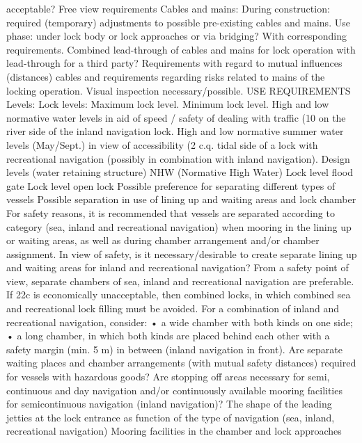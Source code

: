 acceptable?
Free view requirements
Cables and mains:
During construction: required (temporary) adjustments to possible
pre-existing cables and mains.
Use phase: under lock body or lock approaches or via bridging?
With corresponding requirements.
Combined lead-through of cables and mains for lock operation with
lead-through for a third party?
Requirements with regard to mutual influences (distances) cables
and requirements regarding risks related to mains of the locking
operation.
Visual inspection necessary/possible.
USE REQUIREMENTS
Levels:
Lock levels:
Maximum lock level.
Minimum lock level.
High and low normative water levels in aid of speed / safety of
dealing with traffic (10%
on the river side of the inland navigation lock.
High and low normative summer water levels (May/Sept.) in view
of accessibility (2%
c.q. tidal side of a lock with recreational navigation (possibly in
combination with inland navigation).
Design levels (water retaining structure)
NHW (Normative High Water)
Lock level flood gate
Lock level open lock
Possible preference for separating different types of vessels
Possible separation in use of lining up and waiting areas and lock
chamber
For safety reasons, it is recommended that vessels are separated
according to category (sea, inland and recreational navigation)
when mooring in the lining up or waiting areas, as well as during
chamber arrangement and/or chamber assignment.
In view of safety, is it necessary/desirable to create separate lining
up and waiting areas for inland and recreational navigation?
From a safety point of view, separate chambers of sea, inland and
recreational navigation are preferable.
If 22c is economically unacceptable, then combined locks,
in which combined sea and recreational lock filling must be avoided.
For a combination of inland and recreational navigation, consider:
• a wide chamber with both kinds on one side;
• a long chamber, in which both kinds are placed behind each
other with a safety margin (min. 5 m) in between (inland navigation
in front).
Are separate waiting places and chamber arrangements (with
mutual safety distances) required for vessels with hazardous goods?
Are stopping off areas necessary for semi, continuous and day navigation
and/or continuously available mooring facilities for semicontinuous
navigation (inland navigation)?
The shape of the leading jetties at the lock entrance as function of
the type of navigation (sea, inland, recreational navigation)
Mooring facilities in the chamber and lock approaches
